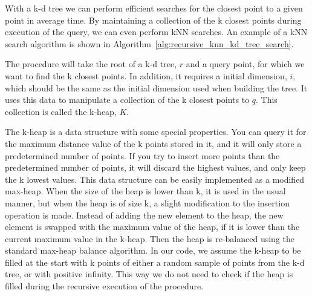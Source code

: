 With a k-d tree we can perform efficient searches for the closest point to a given point in  average time\cite{Friedman:1977}. By maintaining a collection of the k closest points during execution of the query, we can even perform kNN searches. An example of a kNN search algorithm is shown in Algorithm~\ref{alg:recursive_knn_kd_tree_search}.


The procedure will take the root of a k-d tree, $r$ and a query point, for which we want to find the k closest points. In addition, it requires a initial dimension, $i$, which should be the same as the initial dimension used when building the tree. It uses this data to manipulate a collection of the k closest points to $q$. This collection is called the k-heap, $K$.

The k-heap is a data structure with some special properties. You can query it for the maximum distance value of the k points stored in it, and it will only store a predetermined number of points. If you try to insert more points than the predetermined number of points, it will discard the highest values, and only keep the k lowest values. This data structure can be easily implemented as a modified max-heap\citep[Chapter 6]{Cormen:2001}. When the size of the heap is lower than k, it is used in the usual manner, but when the heap is of size k, a slight modification to the insertion operation is made. Instead of adding the new element to the heap, the new element is swapped with the maximum value of the heap, if it is lower than the current maximum value in the k-heap. Then the heap is re-balanced using the standard max-heap balance algorithm. In our code, we assume the k-heap to be filled at the start with k points of either a random sample of points from the k-d tree, or with positive infinity. This way we do not need to check if the heap is filled during the recursive execution of the procedure.


